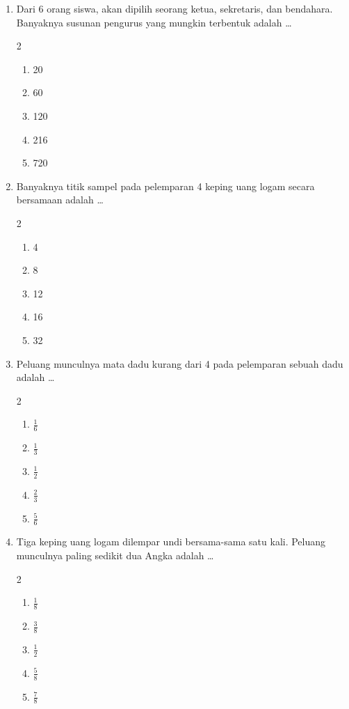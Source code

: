 \documentclass[12pt,a4paper]{article}
\begin{document}
\begin{enumerate}[itemsep=2ex]
    \item Dari 6 orang siswa, akan dipilih seorang ketua, sekretaris, dan bendahara. Banyaknya susunan pengurus yang mungkin terbentuk adalah \dots
    \begin{multicols}{2}
    \begin{enumerate}[label=\Alph*.]
        \item 20
        \item 60
        \item 120
        \item 216
        \item 720
    \end{enumerate}
    \end{multicols}

    \item Banyaknya titik sampel pada pelemparan 4 keping uang logam secara bersamaan adalah \dots
    \begin{multicols}{2}
    \begin{enumerate}[label=\Alph*.]
        \item 4
        \item 8
        \item 12
        \item 16
        \item 32
    \end{enumerate}
    \end{multicols}

    \item Peluang munculnya mata dadu kurang dari 4 pada pelemparan sebuah dadu adalah \dots
    \begin{multicols}{2}
    \begin{enumerate}[label=\Alph*.]
        \item $\frac{1}{6}$
        \item $\frac{1}{3}$
        \item $\frac{1}{2}$
        \item $\frac{2}{3}$
        \item $\frac{5}{6}$
    \end{enumerate}
    \end{multicols}

    \item Tiga keping uang logam dilempar undi bersama-sama satu kali. Peluang munculnya paling sedikit dua Angka adalah \dots
    \begin{multicols}{2}
    \begin{enumerate}[label=\Alph*.]
        \item $\frac{1}{8}$
        \item $\frac{3}{8}$
        \item $\frac{1}{2}$
        \item $\frac{5}{8}$
        \item $\frac{7}{8}$
    \end{enumerate}
    \end{multicols}


\end{enumerate}
\end{document}
